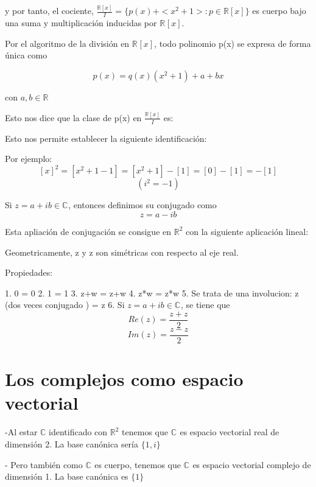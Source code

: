 y por tanto, el cociente, \(\frac{\mathbb{R}[x]}{I} = \{p(x)+<x^2+1> : p \in \mathbb{R}[x]\}\) es cuerpo bajo una suma y multiplicación inducidas por \(\mathbb{R}^{}[x]\).

Por el algoritmo de la división en \(\mathbb{R}^{}[x]\), todo polinomio p(x) se expresa de forma única como

\[p(x) = q(x)(x^2+1) + a +bx\]

con \(a,b \in \mathbb{R}^{}\)

Esto nos dice que la clase de p(x) en \(\frac{\mathbb{R}[x]}{I}\) es:


Esto nos permite establecer la siguiente identificación:


Por ejemplo:
\[[x]^2=[x^2+1-1]=[x^2+1]-[1] = [0] - [1] = -[1]\]
\[(i^2 = -1)\]

\begin{definicion}
  Si \(z = a+ib \in \mathbb{C}^{}\), entonces definimos su conjugado como
  \[ z = a-ib\] %

  Esta apliación de conjugación se consigue en \(\mathbb{R}^{2}\) con la siguiente aplicación lineal:


  Geometricamente, z y z son simétricas con respecto al eje real.


  Propiedades:

  1. 0 = 0
  2. 1 = 1
  3. z+w = z+w
  4. z*w = z*w %
  5. Se trata de una involucion: z (dos veces conjugado ) = z
  6. Si \(z = a+ib \in \mathbb{C}^{}\), se tiene que
  \[ Re(z) = \frac{z+z}{2}\]
  \[Im(z) = \frac{z-z}{2}\]
\end{definicion}

\section{Los complejos como espacio vectorial}

-Al estar \(\mathbb{C}\) identificado con \(\mathbb{R}^{2}\) tenemos que \(\mathbb{C}^{}\) es espacio vectorial real de dimensión 2.
La base canónica sería \(\{1,i\}\)

- Pero también como \(\mathbb{C}^{}\) es cuerpo, tenemos que \(\mathbb{C}^{}\) es espacio vectorial complejo de dimensión 1.
La base canónica es \(\{1\}\)

